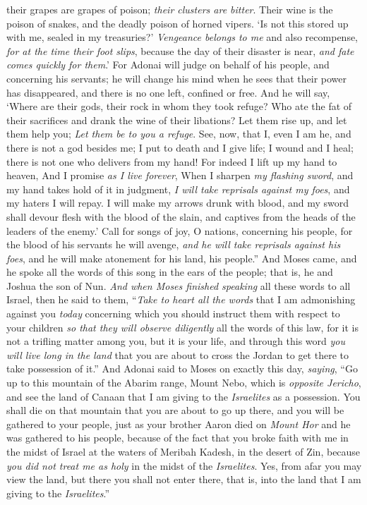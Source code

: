 \begin{biblechapter}
their grapes are grapes of poison; 
\textit{their clusters are bitter}.
\verse Their wine is the poison of snakes, 
and the deadly poison of horned vipers.
\verse ‘Is not this stored up with me, 
sealed in my treasuries?’
\verse \textit{Vengeance belongs to me} and also recompense, 
\textit{for at the time their foot slips}, 
because the day of their disaster is near, 
\textit{and fate comes quickly for them}.’
\verse For Adonai will judge on behalf of his people, 
and concerning his servants; 
he will change his mind when he sees that their power has disappeared, 
and there is no one left, confined or free.
\verse And he will say, ‘Where are their gods, 
their rock in whom they took refuge?
\verse Who ate the fat of their sacrifices 
and drank the wine of their libations? 
Let them rise up, and let them help you; 
\textit{Let them be to you a refuge}.
\verse See, now, that I, even I am he, 
and there is not a god besides me; 
I put to death and I give life; 
I wound and I heal; 
there is not one who delivers from my hand!
\verse For indeed I lift up my hand to heaven, 
And I promise \textit{as I live forever},
\verse When I sharpen \textit{my flashing sword}, 
and my hand takes hold of it in judgment, 
\textit{I will take reprisals against my foes}, 
and my haters I will repay.
\verse I will make my arrows drunk with blood, 
and my sword shall devour flesh with the blood of the slain, 
and captives from the heads of the leaders of the enemy.’
\verse Call for songs of joy, O nations, concerning his people, 
for the blood of his servants he will avenge, 
\textit{and he will take reprisals against his foes}, 
and he will make atonement for his land, his people.”
\verse And Moses came, and he spoke all the words of this song in the ears of the people; that is, he and Joshua the son of Nun.
\verse \textit{And when Moses finished speaking} all these words to all Israel,
\verse then he said to them, “\textit{Take to heart all the words} that I am admonishing against you \textit{today} concerning which you should instruct them with respect to your children \textit{so that they will observe diligently} all the words of this law,
\verse for it is not a trifling matter among you, but it is your life, and through this word \textit{you will live long in the land} that you are about to cross the Jordan to get there to take possession of it.”
 And Adonai said to Moses on exactly this day, \textit{saying},
\verse “Go up to this mountain of the Abarim range, Mount Nebo, which is \textit{opposite Jericho}, and see the land of Canaan that I am giving to the \textit{Israelites} as a possession.
\verse You shall die on that mountain that you are about to go up there, and you will be gathered to your people, just as your brother Aaron died on \textit{Mount Hor} and he was gathered to his people,
\verse because of the fact that you broke faith with me in the midst of Israel at the waters of Meribah Kadesh, in the desert of Zin, because \textit{you did not treat me as holy} in the midst of the \textit{Israelites}.
\verse Yes, from afar you may view the land, but there you shall not enter there, that is, into the land that I am giving to the \textit{Israelites}.”
\end{biblechapter}

